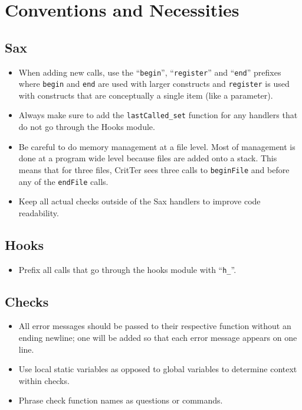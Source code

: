 \documentclass[12pt]{report}
\newcommand{\todoin}{\todo[inline]}
\newcommand{\programName}{CritTer\xspace}
\begin{document}
\chapter{Conventions and Necessities}
\label{conventions}

\todoin{DynArray uses}
\section{Sax}
\begin{itemize}
\item When adding new calls, use the ``\lstinline{begin}'', ``\lstinline{register}'' and ``\lstinline{end}'' prefixes where \lstinline{begin} and \lstinline{end} are used with larger constructs and \lstinline{register} is used with constructs that are conceptually a single item (like a parameter).
\item Always make sure to add the \lstinline{lastCalled_set} function for any handlers that do not go through the Hooks module.
\item Be careful to do memory management at a file level. Most of management is done at a program wide level because files are added onto a stack. This means that for three files, \programName sees three calls to \lstinline{beginFile} and before any of the \lstinline{endFile} calls.
\item Keep all actual checks outside of the Sax handlers to improve code readability.
\end{itemize}

\section{Hooks}
\begin{itemize}
\item Prefix all calls that go through the hooks module with ``\lstinline{h_}''.

\end{itemize}

\section{Checks}
\begin{itemize}
\item All error messages should be passed to their respective function without an ending newline; one 
will be added so that each error message appears on one line.
\item Use local static variables as opposed to global variables to determine context within checks.
\item Phrase check function names as questions or commands.
\end{itemize}

\nocite{*}

\clearpage
{}
{}

\end{document}
